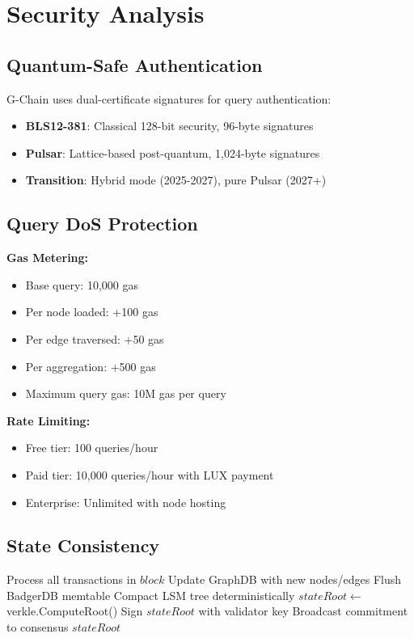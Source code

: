\section{Security Analysis}


\subsection{Quantum-Safe Authentication}

G-Chain uses dual-certificate signatures for query authentication:

\begin{itemize}
\item \textbf{BLS12-381}: Classical 128-bit security, 96-byte signatures
\item \textbf{Pulsar}: Lattice-based post-quantum, 1,024-byte signatures
\item \textbf{Transition}: Hybrid mode (2025-2027), pure Pulsar (2027+)
\end{itemize}

\subsection{Query DoS Protection}

\textbf{Gas Metering:}
\begin{itemize}
\item Base query: 10,000 gas
\item Per node loaded: +100 gas
\item Per edge traversed: +50 gas
\item Per aggregation: +500 gas
\item Maximum query gas: 10M gas per query
\end{itemize}

\textbf{Rate Limiting:}
\begin{itemize}
\item Free tier: 100 queries/hour
\item Paid tier: 10,000 queries/hour with LUX payment
\item Enterprise: Unlimited with node hosting
\end{itemize}

\subsection{State Consistency}

\begin{algorithm}[H]
\caption{Deterministic State Commitment}
\begin{algorithmic}[1]
    \State Process all transactions in $block$
    \State Update GraphDB with new nodes/edges
    \State Flush BadgerDB memtable
    \State Compact LSM tree deterministically
    \State $stateRoot \gets$ verkle.ComputeRoot()
    \State Sign $stateRoot$ with validator key
    \State Broadcast commitment to consensus
    \State \Return $stateRoot$
\EndFunction
\end{algorithmic}
\end{algorithm}

